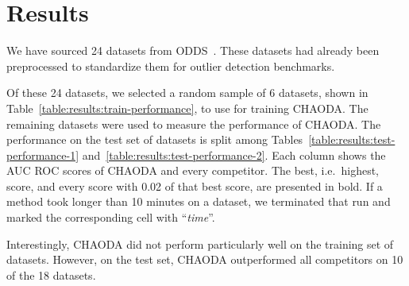 \section{Results}
\label{sec:results}

We have sourced 24 datasets from ODDS~\cite{rayana2016odds}.
These datasets had already been preprocessed to standardize them for outlier detection benchmarks.

Of these 24 datasets, we selected a random sample of 6 datasets, shown in Table~\ref{table:results:train-performance}, to use for training CHAODA\@.
The remaining datasets were used to measure the performance of CHAODA\@.
The performance on the test set of datasets is split among Tables~\ref{table:results:test-performance-1} and~\ref{table:results:test-performance-2}.
Each column shows the AUC ROC scores of CHAODA and every competitor.
The best, i.e.\ highest, score, and every score with 0.02 of that best score, are presented in bold.
If a method took longer than 10 minutes on a dataset, we terminated that run and marked the corresponding cell with ``\textit{time}''.

Interestingly, CHAODA did not perform particularly well on the training set of datasets.
However, on the test set, CHAODA outperformed all competitors on 10 of the 18 datasets.


